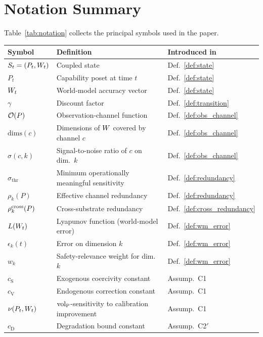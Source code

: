 \newpage
\section{Notation Summary}
\label{app:notation}

Table~\ref{tab:notation} collects the principal symbols used in the
paper.

\begin{table}[h]
\centering
\small
\begin{tabular}{@{}lll@{}}
\toprule
\textbf{Symbol} & \textbf{Definition} & \textbf{Introduced in} \\
\midrule
$S_t = (P_t, W_t)$ & Coupled state & Def.\ \ref{def:state} \\
$P_t$ & Capability poset at time $t$ & Def.\ \ref{def:state} \\
$W_t$ & World-model accuracy vector & Def.\ \ref{def:state} \\
$\gamma$ & Discount factor~\citep[Def.\ 1]{lasser2026horizon} & Def.\ \ref{def:transition} \\
$\mathcal{O}(P)$ & Observation-channel function & Def.\ \ref{def:obs_channel} \\
$\mathrm{dims}(c)$ & Dimensions of $W$ covered by channel $c$ & Def.\ \ref{def:obs_channel} \\
$\sigma(c, k)$ & Signal-to-noise ratio of $c$ on dim.\ $k$ & Def.\ \ref{def:obs_channel} \\
$\sigma_{\mathrm{thr}}$ & Minimum operationally meaningful sensitivity & Def.\ \ref{def:redundancy} \\
$\rho_k(P)$ & Effective channel redundancy & Def.\ \ref{def:redundancy} \\
$\rho^{\mathrm{cross}}_k(P)$ & Cross-substrate redundancy & Def.\ \ref{def:cross_redundancy} \\
$L(W_t)$ & Lyapunov function (world-model error) & Def.\ \ref{def:wm_error} \\
$\epsilon_k(t)$ & Error on dimension $k$ & Def.\ \ref{def:wm_error} \\
$w_k$ & Safety-relevance weight for dim.\ $k$ & Def.\ \ref{def:wm_error} \\
$c_{\mathrm{S}}$ & Exogenous coercivity constant & Assump.\ C1 \\
$c_{\mathrm{V}}$ & Endogenous correction constant & Assump.\ C1 \\
$\nu(P_t, W_t)$ & ${\operatorname{vol}_{\mathrm{P}}}$-sensitivity to calibration improvement & Assump.\ C1 \\
$c_{\mathrm{D}}$ & Degradation bound constant & Assump.\ C2$'$ \\

\end{tabular}
\end{table}
